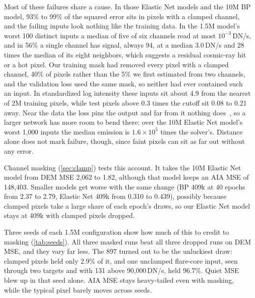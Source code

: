 Most of these failures share a cause. In those Elastic Net models and the 10M BP model, 93\% to 99\% of the squared error sits in pixels with a clamped channel, and the failing inputs look nothing like the training data. In the 1.5M model's worst 100 distinct inputs a median of five of six channels read at most $10^{-3}$\,DN/s, and in 56\% a single channel has signal, always 94\Ang, at a median 3.0\,DN/s and 28 times the median of its eight neighbors, which suggests a residual cosmic-ray hit or a hot pixel. Our training mask had removed every pixel with a clamped channel, 40\% of pixels rather than the 5\% we first estimated from two channels, and the validation loss used the same mask, so neither had ever contained such an input. In standardized log intensity these inputs sit about 4.9 from the nearest of 2M training pixels, while test pixels above 0.3 times the cutoff sit 0.08 to 0.21 away. Near the data the loss pins the output and far from it nothing does~\cite{hein2019relu,xu2021extrapolate}, so a larger network has more room to bend there: over the 10M Elastic Net model's worst 1,000 inputs the median emission is $1.6\times10^5$ times the solver's. Distance alone does not mark failure, though, since faint pixels can sit as far out without any error.

Channel masking (\cref{sec:clamp}) tests this account. It takes the 10M Elastic Net model from DEM MSE 2,062 to 1.82, although that model keeps an AIA MSE of 148,403. Smaller models get worse with the same change (BP 409k at 40 epochs from 2.37 to 2.79, Elastic Net 409k from 0.310 to 0.439), possibly because clamped pixels take a large share of each epoch's draws, so our Elastic Net model stays at 409k with clamped pixels dropped.

Three seeds of each 1.5M configuration show how much of this to credit to masking (\cref{tab:seeds}). All three masked runs beat all three dropped runs on DEM MSE, and they vary far less. The 897 turned out to be the unluckiest draw: clamped pixels held only 2.9\% of it, and one unclamped flare-core input, seen through two targets and with 131\Ang{} above 90,000\,DN/s, held 96.7\%. Quiet MSE blew up in that seed alone. AIA MSE stays heavy-tailed even with masking, while the typical pixel barely moves across seeds.

